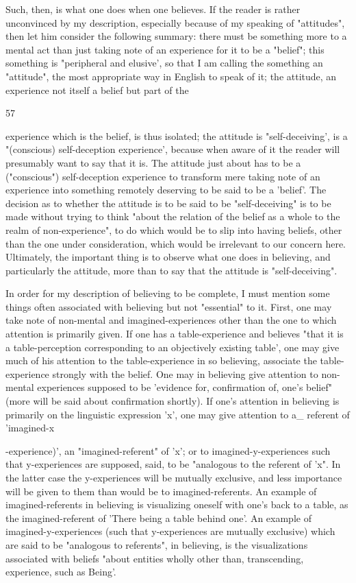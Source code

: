 \documentclass[10pt,twoside]{memoir}
\begin{document}
\begin{enumerate}
{{{{{{{{{{{{{{{Such, then, is what one does when one believes. If the reader is rather 
unconvinced by my description, especially because of my speaking of 
"attitudes", then let him consider the following summary: there must be 
something more to a mental act than just taking note of an experience for it 
to be a "belief"; this something is "peripheral and elusive', so that I am 
calling the something an "attitude", the most appropriate way in English to 
speak of it; the attitude, an experience not itself a belief but part of the 


57 


experience which is the belief, is thus isolated; the attitude is 
"self-deceiving', is a "(conscious) self-deception experience', because when 
aware of it the reader will presumably want to say that it is. The attitude just 
about has to be a ("conscious") self-deception experience to transform mere 
taking note of an experience into something remotely deserving to be said to 
be a 'belief'. The decision as to whether the attitude is to be said to be 
"self-deceiving" is to be made without trying to think "about the relation of 
the belief as a whole to the realm of non-experience", to do which would be 
to slip into having beliefs, other than the one under consideration, which 
would be irrelevant to our concern here. Ultimately, the important thing is 
to observe what one does in believing, and particularly the attitude, more 
than to say that the attitude is "self-deceiving". 

In order for my description of believing to be complete, I must mention 
some things often associated with believing but not "essential" to it. First, 
one may take note of non-mental and imagined-experiences other than the 
one to which attention is primarily given. If one has a table-experience and 
believes "that it is a table-perception corresponding to an objectively existing 
table', one may give much of his attention to the table-experience in so 
believing, associate the table-experience strongly with the belief. One may in 
believing give attention to non-mental experiences supposed to be 'evidence 
for, confirmation of, one's belief" (more will be said about confirmation 
shortly). If one's attention in believing is primarily on the linguistic 
expression 'x', one may give attention to a_ referent of 
'imagined-x{-experience)', an "imagined-referent" of 'x'; or to 
imagined-y-experiences such that y-experiences are supposed, said, to be 
"analogous to the referent of 'x". In the latter case the y-experiences will be 
mutually exclusive, and less importance will be given to them than would be 
to imagined-referents. An example of imagined-referents in believing is 
visualizing oneself with one's back to a table, as the imagined-referent of 
'There being a table behind one'. An example of imagined-y-experiences 
(such that y-experiences are mutually exclusive) which are said to be 
"analogous to referents", in believing, is the visualizations associated with 
beliefs "about entities wholly other than, transcending, experience, such as 
Being'. 

}}}}}}}}}}}}}}}}
\end{enumerate}
\end{document}
